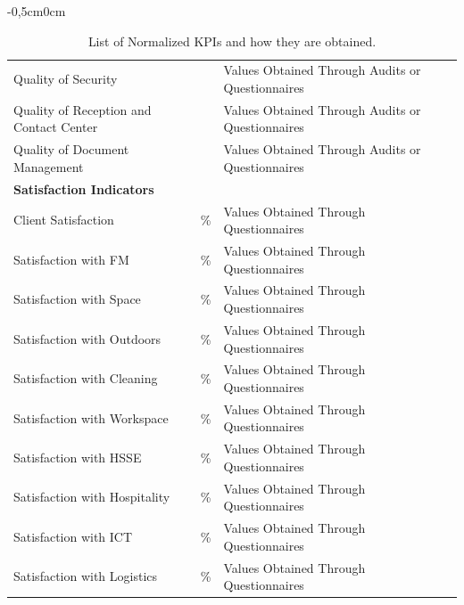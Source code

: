 \begin{table}[h!]
\begin{adjustwidth}{-0,5cm}{0cm}
{\begin{tabular}{llp{8cm}l}
		Quality of Security 						&  & Values Obtained Through Audits or Questionnaires \\
		Quality of Reception and Contact Center 	&  & Values Obtained Through Audits or Questionnaires \\
		Quality of Document Management 				&  & Values Obtained Through Audits or Questionnaires \\ 
		\hline
		{\bf Satisfaction Indicators} & & \\
		Client Satisfaction 			& \% & Values Obtained Through Questionnaires \\
		Satisfaction with FM 			& \% & Values Obtained Through Questionnaires \\
		Satisfaction with Space			& \% & Values Obtained Through Questionnaires \\
		Satisfaction with Outdoors 		& \% & Values Obtained Through Questionnaires \\
		Satisfaction with Cleaning 		& \% & Values Obtained Through Questionnaires \\
		Satisfaction with Workspace 	& \% & Values Obtained Through Questionnaires \\
		Satisfaction with HSSE			& \% & Values Obtained Through Questionnaires \\
		Satisfaction with Hospitality	& \% & Values Obtained Through Questionnaires \\
		Satisfaction with ICT 			& \% & Values Obtained Through Questionnaires \\
		Satisfaction with Logistics 	& \% & Values Obtained Through Questionnaires \\
		\hline
	\end{tabular}
	}
	\end{adjustwidth}
\caption{List of Normalized KPIs and how they are obtained.}
\label{tb:ListSpacialFinancialHowCalculate}
\end{table}

